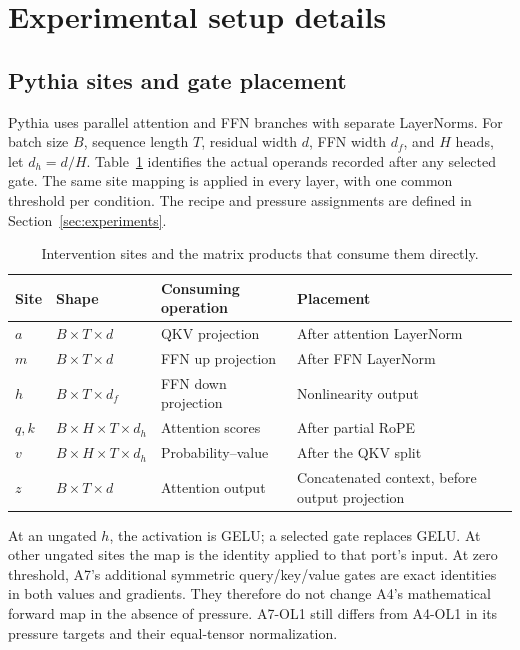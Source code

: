 \section{Experimental setup details}
\label{app:experiment}

\subsection{Pythia sites and gate placement}
\label{app:sites}

Pythia uses parallel attention and FFN branches with separate LayerNorms.
For batch size $B$, sequence length $T$, residual width $d$, FFN width $d_f$,
and $H$ heads, let $d_h=d/H$. Table~\ref{tab:sites} identifies the actual
operands recorded after any selected gate. The same site mapping is applied
in every layer, with one common threshold per condition.
The recipe and pressure assignments are defined in
Section~\ref{sec:experiments}.

\begin{table}[ht]
\centering\small
\caption{Intervention sites and the matrix products that consume them directly.}
\label{tab:sites}
\vspace{4pt}
\begin{tabularx}{\linewidth}{@{}lllX@{}}
\toprule
Site & Shape & Consuming operation & Placement \\
\midrule
$a$ & $B\!\times\!T\!\times\!d$ & QKV projection & After attention LayerNorm \\
$m$ & $B\!\times\!T\!\times\!d$ & FFN up projection & After FFN LayerNorm \\
$h$ & $B\!\times\!T\!\times\!d_f$ & FFN down projection & Nonlinearity output \\
$q,k$ & $B\!\times\!H\!\times\!T\!\times\!d_h$ & Attention scores & After partial RoPE \\
$v$ & $B\!\times\!H\!\times\!T\!\times\!d_h$ & Probability--value & After the QKV split \\
$z$ & $B\!\times\!T\!\times\!d$ & Attention output & Concatenated context, before output projection \\
\bottomrule
\end{tabularx}
\end{table}

At an ungated $h$, the activation is GELU; a selected gate replaces GELU.
At other ungated sites the map is the identity applied to that port's input.
At zero threshold, A7's additional symmetric query/key/value gates are exact
identities in both values and gradients. They therefore do not change A4's
mathematical forward map in the absence of pressure. A7-OL1 still differs
from A4-OL1 in its pressure targets and their equal-tensor normalization.

